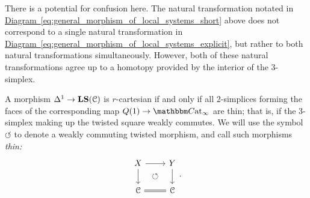 \documentclass[main.tex]{subfiles}
\begin{document}
There is a potential for confusion here. The natural transformation notated in \hyperref[eq:general_morphism_of_local_systems_short]{Diagram~\ref*{eq:general_morphism_of_local_systems_short}} above does not correspond to a single natural transformation in \hyperref[eq:general_morphism_of_local_systems_explicit]{Diagram~\ref*{eq:general_morphism_of_local_systems_explicit}}, but rather to both natural transformations simultaneously. However, both of these natural transformations agree up to a homotopy provided by the interior of the 3-simplex.

A morphism $\Delta^{1} \to \mathbf{LS}(\mathcal{C})$ is $r$-cartesian if and only if all 2-simplices forming the faces of the corresponding map $Q(1) \to \ICCat$ are thin; that is, if the 3-simplex making up the twisted square weakly commutes. We will use the symbol $\circlearrowleft$ to denote a weakly commuting twisted morphism, and call such morphisms \emph{thin:}
\begin{equation*}
  \begin{tikzcd}
    X
    \arrow[r]
    \arrow[d, ""{name=L, right}]
    & Y
    \arrow[d, ""{name=R, left}]
    \\
    \category{C}
    & \category{C}
    \arrow[l, equals]
    \arrow[Rightarrow, from=L, to=R, shorten=1.5ex, phantom, "\circlearrowleft"]
  \end{tikzcd}.
\end{equation*}
\end{document}
